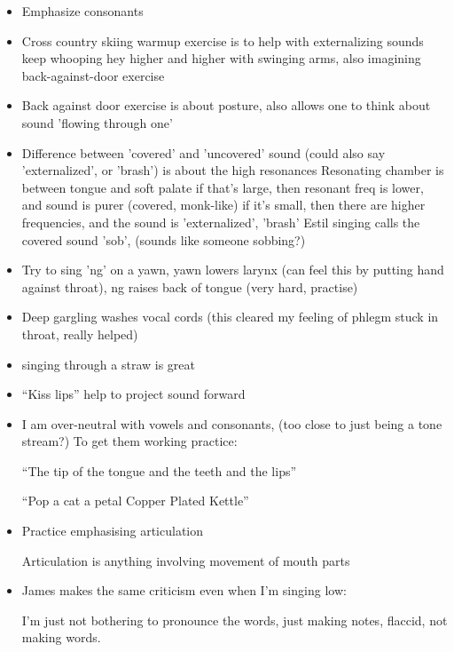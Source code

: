 \documentclass[14pt,a4paper]{memoir}
\begin{document}
\begin{itemize}
  \item Emphasize consonants


  \item Cross country skiing warmup exercise is to help with externalizing sounds
    keep whooping hey higher and higher with swinging arms, also imagining back-against-door exercise

  \item Back against door exercise is about posture, also allows one to think about sound 'flowing through one'

  \item Difference between 'covered' and 'uncovered' sound (could also say 'externalized', or 'brash')
    is about the high resonances
    Resonating chamber is between tongue and soft palate
    if that's large, then resonant freq is lower, and sound is purer (covered, monk-like)
    if it's small, then there are higher frequencies, and the sound is 'externalized', 'brash'
    Estil singing calls the covered sound 'sob', (sounds like someone sobbing?)

  \item Try to sing 'ng' on a yawn, yawn lowers larynx (can feel this by putting hand against throat), ng raises back of tongue (very hard, practise)

  \item Deep gargling washes vocal cords (this cleared my feeling of phlegm stuck in throat, really helped)

  \item singing through a straw is great

  \item ``Kiss lips'' help to project sound forward

  \item I am over-neutral with vowels and consonants, (too close to just being a tone stream?)
  To get them working practice:

  ``The tip of the tongue and the teeth and the lips''
  
  ``Pop a cat a petal Copper Plated Kettle''

  \item Practice emphasising articulation

    Articulation is anything involving movement of mouth parts

  \item James makes the same criticism even when I'm singing low:

    I'm just not bothering to pronounce the words, just making notes, flaccid, not making words.


\end{itemize}
\end{document}

